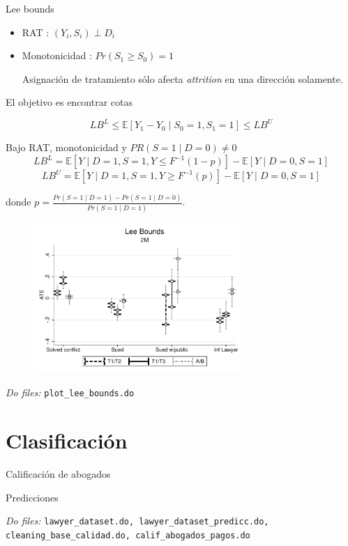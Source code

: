 \documentclass[8pt]{beamer}
\begin{document}
\begin{frame}[allowframebreaks]{Lee bounds}
    
    \begin{itemize}
        \item RAT : $(Y_i, S_i) \perp D_i$
        \item Monotonicidad : $Pr(S_1\geq S_0)=1$
        
        Asignación de tratamiento sólo afecta \emph{attrition} en una dirección solamente.
    \end{itemize}

El objetivo es encontrar cotas 

\[LB^{L} \leq \mathbb{E}[Y_{1}-Y_{0}\;|\;S_0=1,S_1=1]\leq LB^{U}\]

\framebreak

\begin{theorem}
 Bajo RAT, monotonicidad y $PR(S=1\;|\;D=0)\neq 0$
\[LB^{L} = \mathbb{E}[Y\;|\;D=1, S=1, Y\leq F^{-1}(1-p)]-\mathbb{E}[Y\;|\;D=0, S=1]\]
\[LB^{U} = \mathbb{E}[Y\;|\;D=1, S=1, Y\geq F^{-1}(p)]-\mathbb{E}[Y\;|\;D=0, S=1]\]

donde $p=\frac{Pr(S=1\;|\;D=1)-Pr(S=1\;|\;D=0)}{Pr(S=1\;|\;D=1)}$.
\end{theorem}

\framebreak
\begin{figure}[H]
    \begin{center}
        \includegraphics[width=0.7\textwidth]{Figuras/lee_bounds_2m.pdf}
        \end{center}
\end{figure}
 \textit{Do files: } \texttt{plot\_lee\_bounds.do}
    
\end{frame}
\section{Clasificación}
\begin{frame}{Calificación de abogados}
    \begin{table}[H]
\caption{Predicciones}
\begin{center}
\tiny{}
\end{center}
    
    {\footnotesize \textit{Do files: } \texttt{lawyer\_dataset.do, lawyer\_dataset\_predicc.do, cleaning\_base\_calidad.do, calif\_abogados\_pagos.do}} 
    
\end{table}
\end{frame}
\end{document}
